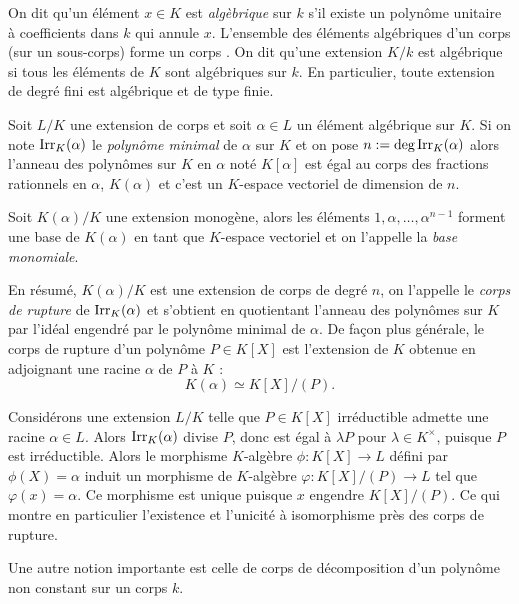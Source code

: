 \documentclass[a4paper]{article} %
\numberwithin{section}{part}
\numberwithin{equation}{section}
\newcommand\Irr[2]{\textup{Irr}_{#1}(#2)}
\begin{document}
On dit qu'un élément $x\in K$ est \emph{algèbrique} sur $k$ s'il existe un 
polynôme unitaire à coefficients dans $k$ qui annule $x$. L'ensemble des 
éléments algébriques d'un corps (sur un sous-corps) forme un corps \cite[p.~64, 
théorème 1.14]{Per}. On dit qu'une extension $K/k$ est algébrique si tous les 
éléments de $K$ sont algébriques sur $k$. En particulier, toute extension de
degré fini est algébrique et de type finie.

Soit $L/K$ une extension de corps et soit $\alpha\in L$ un élément algébrique 
sur $K$. Si on note $\Irr{K}{\alpha}$ le \emph{polynôme minimal} de $\alpha$ sur
$K$ et on pose $n := \textup{deg\,}\Irr{K}{\alpha}$ alors l'anneau des polynômes
sur $K$ en $\alpha$ noté $K[\alpha]$ est égal au corps des fractions rationnels
en $\alpha$, $K(\alpha)$ et c'est un $K$-espace vectoriel de dimension de $n$.
\begin{defn}
Soit $K(\alpha)/K$ une extension monogène, alors les éléments 
$1,\alpha,\dots,\alpha^{n-1}$ forment une base de $K(\alpha)$ en tant que
$K$-espace vectoriel et on l'appelle la \emph{base monomiale}.
\end{defn}

En résumé, $K(\alpha)/K$ est une extension de corps de
degré $n$, on l'appelle le \emph{corps de rupture} de $\Irr{K}{\alpha}$ et
s'obtient en quotientant l'anneau des polynômes sur $K$ par l'idéal engendré par
le polynôme minimal de $\alpha$. De façon plus générale, le corps de rupture 
d'un polynôme $P\in K[X]$ est l'extension de $K$ obtenue en adjoignant une 
racine $\alpha$ de $P$ à $K$ :
\begin{equation}
K(\alpha)\simeq K[X]/(P).
\end{equation}

Considérons une extension $L/K$ telle que $P\in K[X]$ irréductible admette une 
racine $\alpha\in L$. Alors $\Irr{K}{\alpha}$ divise $P$, donc est égal à 
$\lambda P$ pour $\lambda\in K^{\times}$, puisque $P$ est irréductible. Alors 
le morphisme $K$-algèbre $\phi : K[X] \to L$ défini par $\phi(X) = \alpha$ 
induit un morphisme de $K$-algèbre $\varphi : K[X]/(P) \to L$ tel que 
$\varphi(x) = \alpha$. Ce morphisme est unique puisque $x$ engendre $K[X]/(P)$. 
Ce qui montre en particulier l'existence et l'unicité à isomorphisme près des 
corps de rupture.\par
\vspace{0.3cm}
Une autre notion importante est celle de corps de décomposition d'un polynôme 
non constant sur un corps $k$.
\end{document}
